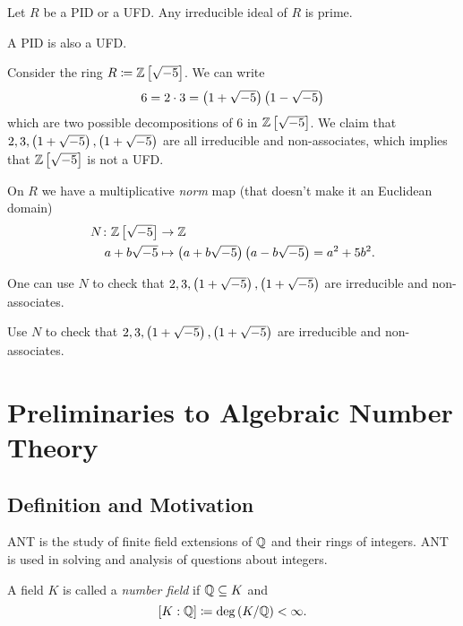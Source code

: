 \documentclass[11pt]{article}
\begin{document}
\begin{corollary}
Let $R$ be a PID or a UFD. Any irreducible ideal of $R$ is prime.
\end{corollary}

\begin{exercise}
A PID is also a UFD.
\end{exercise}

\begin{example}
Consider the ring $R \coloneqq \mathbb{Z}\left[ \sqrt{-5} \right]$. We can write
\[6 = 2 \cdot 3 = \left( 1 + \sqrt{-5} \right)\left( 1 - \sqrt{-5} \right)\]
which are two possible decompositions of $6$ in $\mathbb{Z}\left[ \sqrt{-5} \right]$. We claim that $2,3, \left( 1+\sqrt{-5} \right), \left( 1+\sqrt{-5} \right)$ are all irreducible and non-associates, which implies that $\mathbb{Z}\left[ \sqrt{-5} \right]$ is not a UFD.

On $R$ we have a multiplicative \emph{norm} map (that doesn't make it an Euclidean domain)
\begin{align*}
N \colon \mathbb{Z}\left[ \sqrt{-5} \right] &\to \mathbb{Z} \\
a + b\sqrt{-5} &\mapsto \left( a+b\sqrt{-5} \right)\left( a - b\sqrt{-5} \right) = a^2 + 5 b^2 \text{.}
\end{align*}

One can use $N$ to check that $2,3, \left( 1+\sqrt{-5} \right), \left( 1+\sqrt{-5} \right)$ are irreducible and non-associates.
\end{example}

\begin{exercise}
Use $N$ to check that $2,3, \left( 1+\sqrt{-5} \right), \left( 1+\sqrt{-5} \right)$ are irreducible and non-associates.
\end{exercise}

\section{Preliminaries to Algebraic Number Theory}

\subsection{Definition and Motivation}

ANT is the study of finite field extensions of $\mathbb{Q}$ and their rings of integers. ANT is used in solving and analysis of questions about integers.

\begin{definition}
A field $K$ is called a \emph{number field} if $\mathbb{Q} \subseteq K$ and \[\left[ K : \mathbb{Q} \right] \coloneqq \deg\left( K/\mathbb{Q} \right) < \infty \text{.}\]
\end{definition}
\end{document}
